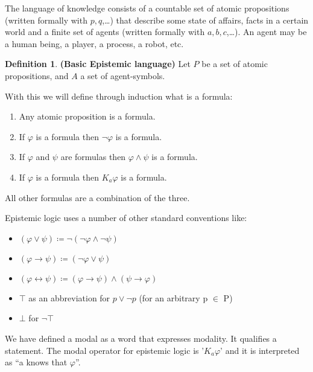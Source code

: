 \documentclass[12pt]{article}
\numberwithin{equation}{section}
\theoremstyle{definition}
\theoremstyle{definition}
\newtheorem{defn}[thm]{Definition}
\theoremstyle{remark}
\begin{document}
The language of knowledge consists of a countable set of atomic propositions (written formally with $p, q$,\dots) that describe some state of affairs, facts in a certain world and a finite set of agents (written formally with $a, b, c$,\dots). An agent may be a human being, a player, a process, a robot, etc.

\begin{defn}
\textbf{(Basic Epistemic language)} Let $P$ be a set of atomic propositions, and $A$ a set of agent-symbols.

With this we will define through induction what is a formula:
\begin{enumerate}
    \item Any atomic proposition is a formula. 
    \item If $\varphi$ is a formula then $\neg\varphi$ is a formula.
    \item If $\varphi$ and $\psi$ are formulas then $\varphi \land \psi$ is a formula.
    \item If $\varphi$ is a formula then $K_a \varphi$ is a formula.
\end{enumerate}

All other formulas are a combination of the three.

\end{defn}
 
Epistemic logic uses a number of other standard conventions like: 
\begin{itemize}
\item $(\varphi \lor \psi) \coloneqq \neg(\neg \varphi \land \neg \psi)$
\item $(\varphi \rightarrow \psi) \coloneqq (\neg\varphi \lor \psi)$
\item $(\varphi \leftrightarrow \psi) \coloneqq (\varphi \rightarrow \psi) \land (\psi \rightarrow \varphi)$

\item $ \top$ as an abbreviation for $p\lor\neg p$ (for an arbitrary p $\in$ P)
\item $ \bot $ for $ \neg\top$
\end{itemize}
We have defined a modal as a word that expresses modality. It qualifies a statement. The modal operator for epistemic logic is '$K_a\varphi$' and it is interpreted as ``a knows that $ \varphi$''. 
\end{document}
